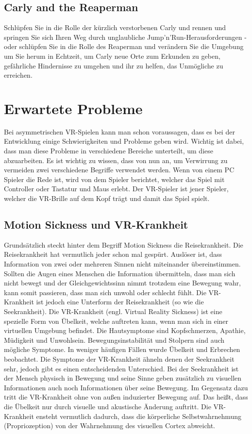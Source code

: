 \subsection{Carly and the Reaperman}
Schlüpfen Sie in die Rolle der kürzlich verstorbenen Carly und rennen und springen Sie sich Ihren Weg durch unglaubliche Jump'n'Run-Herausforderungen - oder schlüpfen Sie in die Rolle des Reaperman und verändern Sie die Umgebung um Sie herum in Echtzeit, um Carly neue Orte zum Erkunden zu geben, gefährliche Hindernisse zu umgehen und ihr zu helfen, das Unmögliche zu erreichen.
\cite{_steam_carly}

\section{Erwartete Probleme}
Bei asymmetrischen VR-Spielen kann man schon voraussagen, dass es bei der Entwicklung einige Schwierigkeiten und Probleme geben wird. Wichtig ist dabei, dass man diese Probleme in verschiedene Bereiche unterteilt, um diese abzuarbeiten. Es ist wichtig zu wissen, dass von nun an, um Verwirrung zu vermeiden zwei verschiedene Begriffe verwendet werden. Wenn von einem PC Spieler die Rede ist, wird von dem Spieler berichtet, welcher das Spiel mit Controller oder Tastatur und Maus erlebt. Der VR-Spieler ist jener Spieler, welcher die VR-Brille auf dem Kopf trägt und damit das Spiel spielt. 

\subsection{Motion Sickness und VR-Krankheit} \label{simon_motionsickness}
Grundsätzlich steckt hinter dem Begriff Motion Sickness die Reisekrankheit. Die Reisekrankheit hat vermutlich jeder schon mal gespürt. Auslöser ist, dass Information von zwei oder mehreren Sinnen nicht miteinander übereinstimmen. Sollten die Augen eines Menschen die Information übermitteln, dass man sich nicht bewegt und der Gleichgewichtssinn nimmt trotzdem eine Bewegung wahr, kann somit passieren, dass man sich unwohl oder schlecht fühlt. Die VR-Krankheit ist jedoch eine Unterform der Reisekrankheit (so wie die Seekrankheit).
Die VR-Krankheit (engl. Virtual Reality Sickness) ist eine spezielle Form von Übelkeit, welche auftreten kann, wenn man sich in einer virtuellen Umgebung befindet. Die Hautsymptome sind Kopfschmerzen, Apathie, Müdigkeit und Unwohlsein. Bewegungsinstabilität und Stolpern sind auch mögliche Symptome. In weniger häufigen Fällen wurde Übelkeit und Erbrechen beobachtet. Die Symptome der VR-Krankheit ähneln denen der Seekrankheit sehr, jedoch gibt es einen entscheidenden Unterschied. Bei der Seekrankheit ist der Mensch physisch in Bewegung und seine Sinne geben zusätzlich zu visuellen Informationen auch noch Informationen über seine Bewegung. Im Gegensatz dazu tritt die VR-Krankheit ohne von außen induzierter Bewegung auf. Das heißt, dass die Übelkeit nur durch visuelle und akustische Änderung auftritt. Die VR-Krankheit ensteht vermutlich dadurch, dass die körperliche Selbstwahrnehmung (Propriozeption) von der Wahrnehmung des visuellen Cortex abweicht.

